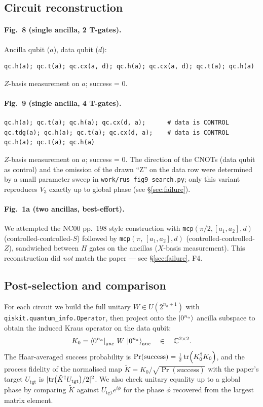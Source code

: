 \documentclass[11pt,a4paper]{article}
\newcommand{\Vthree}{V_{\!3}}
\newcommand{\Prsucc}{\Pr(\text{success})}
\begin{document}
\subsection{Circuit reconstruction}

\paragraph{Fig.~8 (single ancilla, 2 T-gates).}
Ancilla qubit ($a$), data qubit ($d$):
\begin{lstlisting}
qc.h(a); qc.t(a); qc.cx(a, d); qc.h(a); qc.cx(a, d); qc.t(a); qc.h(a)
\end{lstlisting}
$Z$-basis measurement on $a$; success = 0.

\paragraph{Fig.~9 (single ancilla, 4 T-gates).}
\begin{lstlisting}
qc.h(a); qc.t(a); qc.h(a); qc.cx(d, a);      # data is CONTROL
qc.tdg(a); qc.h(a); qc.t(a); qc.cx(d, a);    # data is CONTROL
qc.h(a); qc.t(a); qc.h(a)
\end{lstlisting}
$Z$-basis measurement on $a$; success = 0.  The direction of the CNOTs (data
qubit as control) and the omission of the drawn ``Z'' on the data row were
determined by a small parameter sweep in
\texttt{work/rus\_fig9\_search.py}; only this variant reproduces $\Vthree$
exactly up to global phase (see \S\ref{sec:failure}).

\paragraph{Fig.~1a (two ancillas, best-effort).}
We attempted the NC00 pp.~198 style construction with
\texttt{mcp}$(\pi/2, [a_1,a_2], d)$ (controlled-controlled-$S$) followed by
\texttt{mcp}$(\pi,\,[a_1,a_2], d)$ (controlled-controlled-$Z$), sandwiched
between $H$ gates on the ancillas ($X$-basis measurement).  This reconstruction
did \emph{not} match the paper --- see \S\ref{sec:failure}, F4.

\subsection{Post-selection and comparison}
For each circuit we build the full unitary $W \in U(2^{n_a+1})$ with
\texttt{qiskit.quantum\_info.Operator}, then project onto the
$\ket{0^{n_a}}$ ancilla subspace to obtain the induced Kraus operator on the
data qubit:
\[
K_0 = \bra{0^{n_a}}_{\text{anc}}\, W\, \ket{0^{n_a}}_{\text{anc}}
\quad\in\quad \mathbb{C}^{2\times 2}.
\]
The Haar-averaged success probability is
$\Prsucc = \tfrac12\tr(K_0^\dagger K_0)$, and the process fidelity of the
normalised map $\tilde K = K_0/\sqrt{\Prsucc}$ with the paper's target
$U_{\text{tgt}}$ is $\lvert \tr(\tilde K^\dagger U_{\text{tgt}})/2 \rvert^2$.
We also check unitary equality up to a global phase by comparing $\tilde K$
against $U_{\text{tgt}}e^{i\phi}$ for the phase $\phi$ recovered from the
largest matrix element.
\end{document}
